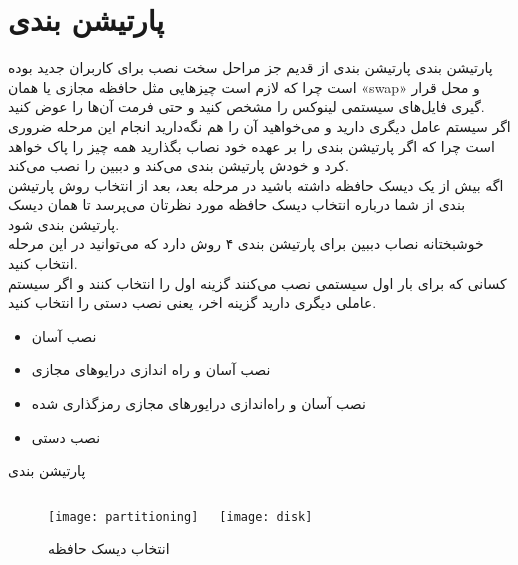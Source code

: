 \section{پارتیشن بندی}
\begin{frame}{پارتیشن بندی}
  پارتیشن بندی از قدیم جز مراحل سخت نصب برای کاربران جدید بوده است چرا که لازم است چیزهایی مثل حافظه مجازی یا همان «swap» و محل قرار گیری فایل‌های سیستمی لینوکس را مشخص کنید و حتی فرمت آن‌ها را عوض کنید.\\
  اگر سیستم عامل دیگری دارید و می‌خواهید آن را هم نگه‌دارید انجام این مرحله ضروری است چرا که اگر پارتیشن بندی را بر عهده خود نصاب بگذارید همه چیز را پاک خواهد کرد و خودش پارتیشن بندی می‌کند و دببین را نصب می‌کند.\\
  اگه بیش از یک دیسک حافظه داشته باشید در مرحله بعد، بعد از انتخاب روش پارتیشن بندی از شما درباره انتخاب دیسک حافظه مورد نظرتان می‌پرسد تا همان دیسک پارتیشن بندی شود.\\
  خوشبختانه نصاب دببین برای پارتیشن بندی ۴ روش دارد که می‌توانید در این مرحله انتخاب کنید.\\
  کسانی که برای بار اول سیستمی نصب می‌کنند گزینه اول را انتخاب کنند و اگر سیستم عاملی دیگری دارید گزینه اخر، یعنی نصب دستی را انتخاب کنید.\\
  \begin{itemize}
    \item نصب آسان
    \item نصب آسان و راه اندازی درایوهای مجازی
    \item نصب آسان و راه‌اندازی درایورهای مجازی رمزگذاری شده
    \item نصب دستی
  \end{itemize}
\end{frame}


\begin{frame}{پارتیشن بندی}
    \begin{figure}
      \begin{columns}
        \texttt{[image: partitioning]}
        \caption{انتخاب روش پارتیشن بندی~\cite{fig:deb_partitioning,}}
        \texttt{[image: disk]}
        \caption{انتخاب دیسک حافظه~\cite{fig:deb_disk}}
      \end{columns}
    \end{figure}
\end{frame}

